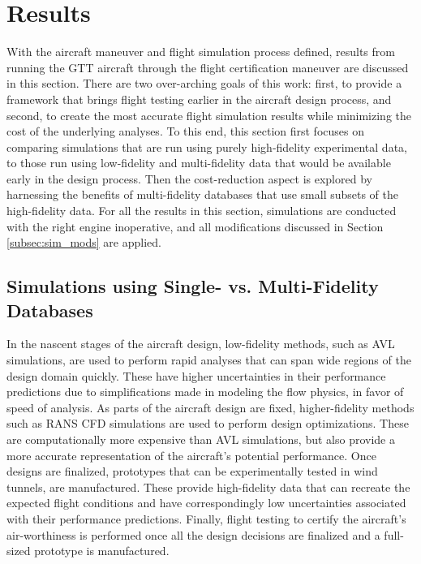\section{Results} \label{sec:cba_results}
With the aircraft maneuver and flight simulation process defined, results from running the GTT aircraft through the flight certification maneuver are discussed in this section.
There are two over-arching goals of this work: first, to provide a framework that brings flight testing earlier in the aircraft design process, and second, to create the most accurate flight simulation results while minimizing the cost of the underlying analyses. 
To this end, this section first focuses on comparing simulations that are run using purely high-fidelity experimental data, to those run using low-fidelity and multi-fidelity data that would be available early in the design process.
Then the cost-reduction aspect is explored by harnessing the benefits of multi-fidelity databases that use small subsets of the high-fidelity data. 
For all the results in this section, simulations are conducted with the right engine inoperative, and all modifications discussed in Section \ref{subsec:sim_mods} are applied.

\subsection{Simulations using Single- vs. Multi-Fidelity Databases} \label{subsec:sf_vs_mf_cba}

In the nascent stages of the aircraft design, low-fidelity methods, such as AVL simulations, are used to perform rapid analyses that can span wide regions of the design domain quickly. 
These have higher uncertainties in their performance predictions due to simplifications made in modeling the flow physics, in favor of speed of analysis.
As parts of the aircraft design are fixed, higher-fidelity methods such as RANS CFD simulations are used to perform design optimizations.
These are computationally more expensive than AVL simulations, but also provide a more accurate representation of the aircraft's potential performance. 
Once designs are finalized, prototypes that can be experimentally tested in wind tunnels, are manufactured. 
These provide high-fidelity data that can recreate the expected flight conditions and have correspondingly low uncertainties associated with their performance predictions.
Finally, flight testing to certify the aircraft's air-worthiness is performed once all the design decisions are finalized and a full-sized prototype is manufactured.

